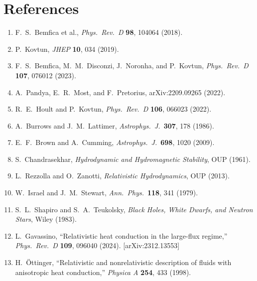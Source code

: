 \section*{References}

\begin{enumerate}
\item F.~S.~Bemfica et al., \textit{Phys.\ Rev.\ D} \textbf{98}, 104064 (2018).
\item P.~Kovtun, \textit{JHEP} \textbf{10}, 034 (2019).
\item F.~S.~Bemfica, M.~M.~Disconzi, J.~Noronha, and P.~Kovtun,
  \textit{Phys.\ Rev.\ D} \textbf{107}, 076012 (2023).
\item A.~Pandya, E.~R.~Most, and F.~Pretorius, arXiv:2209.09265 (2022).
\item R.~E.~Hoult and P.~Kovtun, \textit{Phys.\ Rev.\ D} \textbf{106}, 066023 (2022).
\item A.~Burrows and J.~M.~Lattimer, \textit{Astrophys.\ J.}\ \textbf{307}, 178 (1986).
\item E.~F.~Brown and A.~Cumming, \textit{Astrophys.\ J.}\ \textbf{698}, 1020 (2009).
\item S.~Chandrasekhar, \textit{Hydrodynamic and Hydromagnetic Stability}, OUP (1961).
\item L.~Rezzolla and O.~Zanotti, \textit{Relativistic Hydrodynamics}, OUP (2013).
\item W.~Israel and J.~M.~Stewart, \textit{Ann.\ Phys.}\ \textbf{118}, 341 (1979).
\item S.~L.~Shapiro and S.~A.~Teukolsky, \textit{Black Holes, White Dwarfs, and Neutron Stars}, Wiley (1983).
\item L.~Gavassino, ``Relativistic heat conduction in the large-flux regime,''
  \textit{Phys.\ Rev.\ D} \textbf{109}, 096040 (2024). [arXiv:2312.13553]
\item H.~\"Ottinger, ``Relativistic and nonrelativistic description of fluids with anisotropic heat conduction,''
  \textit{Physica A} \textbf{254}, 433 (1998).
\end{enumerate}

